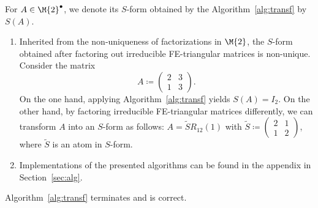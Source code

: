 \begin{notation*}
For $A \in {\M{2}}^\bullet$, we denote its $S$-form obtained by the Algorithm~\ref{alg:transf} by $S(A)$.
\end{notation*}

\begin{remark*}
\mbox{}\vspace{-2\topskip}
\begin{enumerate}[label=(\alph*)]
\item Inherited from the non-uniqueness of factorizations in $\M{2}$, the $S$-form obtained after factoring out irreducible FE-triangular matrices is non-unique. Consider the matrix 
\[ A \coloneqq \begin{pmatrix} 2 & 3 \\ 1 & 3 \end{pmatrix}. \]
On the one hand, applying Algorithm~\ref{alg:transf} yields $S(A) = I_2$. On the other hand, by factoring irreducible FE-triangular matrices differently, we can transform $A$ into an $S$-form as follows: $A = \tilde{S}R_{12}(1)$ with $\tilde{S} \coloneqq \begin{pmatrix} 2 &1 \\ 1& 2 \end{pmatrix}$, where $\tilde{S}$ is an atom in $S$-form.
\item Implementations of the presented algorithms can be found in the appendix in Section~\ref{sec:alg}.
\end{enumerate}
\end{remark*}

\newpage
\begin{proposition}\label{prop:alg}
Algorithm~\ref{alg:transf} terminates and is correct.
\end{proposition}

